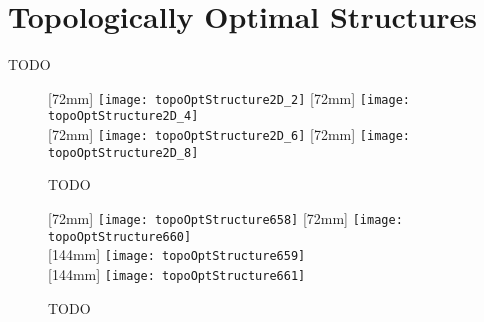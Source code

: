 \chapter{Topologically Optimal Structures}
\label{chap:a30structures}

TODO

\begin{figure}
  [72mm]{%
    \texttt{[image: topoOptStructure2D\_2]}%
  }%
  \hfill%
  [72mm]{%
    \texttt{[image: topoOptStructure2D\_4]}%
  }%
  \\[2mm]%
  [72mm]{%
    \texttt{[image: topoOptStructure2D\_6]}%
  }%
  \hfill%
  [72mm]{%
    \texttt{[image: topoOptStructure2D\_8]}%
  }%
  \caption[TODO]{%
    TODO%
  }%
  \label{fig:topoOptStructure2DLShape}%
\end{figure}

\begin{figure}
  \newcommand*{\myscale}{0.19}%
  [72mm]{%
    \texttt{[image: topoOptStructure658]}%
  }%
  \hfill%
  [72mm]{%
    \texttt{[image: topoOptStructure660]}%
  }%
  \\[2mm]%
  [144mm]{%
    \texttt{[image: topoOptStructure659]}%
  }%
  \\[2mm]%
  [144mm]{%
    \texttt{[image: topoOptStructure661]}%
  }%
  \caption[TODO]{%
    TODO%
  }%
  \label{fig:topoOptStructure3D}%
\end{figure}

